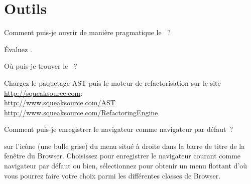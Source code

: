 \documentclass[a4paper,10pt,twoside]{book}
\begin{document}
\section{Outils}

\begin{faq}
Comment puis-je ouvrir de manière pragmatique le  ~?
\end{faq}
\answer
Évaluez .

\begin{faq}
Où puis-je trouver le ~?
\end{faq}
\answer
Chargez le paquetage AST puis le moteur de 
refactorisation sur le site \url{http://squeaksource.com}:\\
\url{http://www.squeaksource.com/AST}\\
\url{http://www.squeaksource.com/RefactoringEngine}

\begin{faq}
Comment puis-je enregistrer le navigateur comme navigateur par défaut~?
\end{faq}
\answer
\Clickz{} sur l'icône (une bulle grise) du menu situé à droite dans la barre de
titre de la fenêtre du Browser. %
Choisissez  pour enregistrer le navigateur courant comme navigateur par défaut ou bien, sélectionnez  pour obtenir un menu flottant d'où vous pourrez faire votre choix parmi les différentes classes de Browser.

\end{document}
